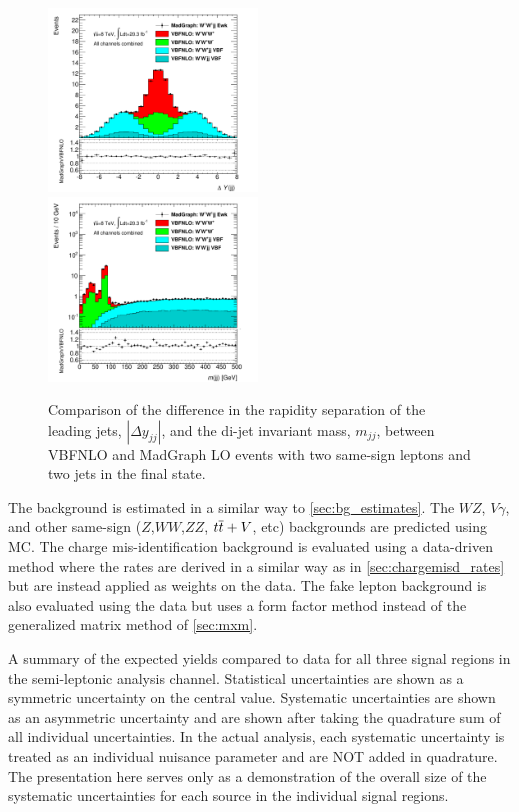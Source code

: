 \begin{figure}[h]
  \begin{center}
    \includegraphics[width=0.495\textwidth]{figures/combination/dY2j_linear_ratio.pdf}
    \includegraphics[width=0.495\textwidth]{figures/combination/TwojM_log_ratio.pdf}
  \end{center}
  \caption{Comparison of the difference in the rapidity separation of the leading
  jets, $|\Delta y_{jj}|$, and the di-jet invariant mass, $m_{jj}$, between VBFNLO and MadGraph LO events with two same-sign leptons and two jets in the final state. }
  \label{fig:signal_semilep} 
\end{figure}


The background is estimated in a similar way to \sec\ref{sec:bg_estimates}. The $WZ$, 
$V\gamma$, and other same-sign ($Z$,$WW$,$ZZ$, $t\overline{t}+V$, etc) backgrounds are predicted
using MC. The charge mis-identification background is evaluated using a data-driven method
where the rates are derived in a similar way as in \sec\ref{sec:chargemisd_rates}
but are instead applied as weights on the data.
The fake lepton background is also evaluated using the data but uses a form factor method
instead of the generalized matrix method of \sec\ref{sec:mxm}.


\begin{table}[ht!]
\centering

\caption{A summary of the expected yields compared to data for all 
three signal regions in the semi-leptonic analysis channel.  
Statistical uncertainties are shown 
as a symmetric uncertainty on the central value. Systematic uncertainties 
are shown as an asymmetric uncertainty and are shown
after taking the quadrature sum of all individual uncertainties. 
In the actual analysis, each systematic uncertainty is
treated as an individual nuisance parameter and are NOT added in quadrature.  
The presentation here serves only as a demonstration
of the overall size of the systematic uncertainties for each source in the 
individual signal regions.}
\label{tab:yields_2l2j}
\end{table}

